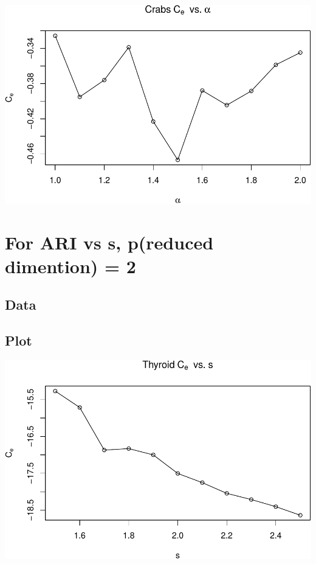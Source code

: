 \documentclass[]{article}
\begin{document}
\begin{center}\includegraphics[width=1\linewidth]{Report_files/figure-latex/unnamed-chunk-22-7} \end{center}

\section{For ARI vs s, p(reduced dimention) =
2}\label{for-ari-vs-s-preduced-dimention-2}

\subsection{Data}\label{data-2}

\subsection{Plot}\label{plot-2}

\begin{center}\includegraphics[width=1\linewidth]{Report_files/figure-latex/unnamed-chunk-24-1} \end{center}
\end{document}
